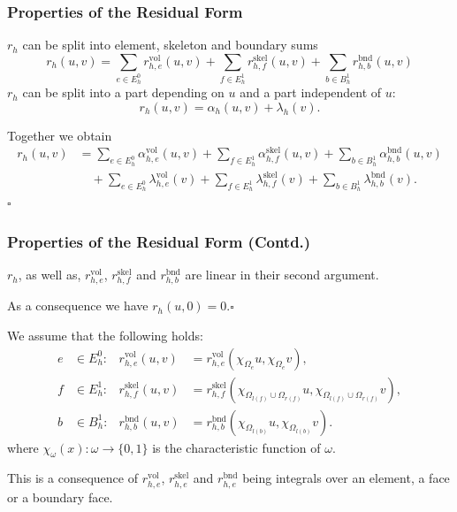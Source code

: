 \begin{frame}
\frametitle<presentation>{Properties of the Residual Form}
\begin{Pro}[Splitting]
$r_h$ can be split into element, skeleton and boundary sums
\begin{equation*}
r_h(u,v) = \sum_{e\in E^0_h} r^\text{vol}_{h,e}(u,v) + \sum_{f\in E^1_h} r^\text{skel}_{h,f}(u,v)
+ \sum_{b\in B^1_h} r^\text{bnd}_{h,b}(u,v)
\end{equation*}
$r_h$ can be split into a part depending
on $u$ and a part independent of $u$:
\begin{equation*}
r_h(u,v) = \alpha_h(u,v) + \lambda_h(v) .
\end{equation*}

Together we obtain
\begin{equation}
\begin{split}
r_h(u,v) &= \sum_{e\in E^0_h} \alpha^\text{vol}_{h,e}(u,v) + \sum_{f\in E^1_h} \alpha^\text{skel}_{h,f}(u,v)
+ \sum_{b\in B^1_h} \alpha^\text{bnd}_{h,b}(u,v)\\
&\quad + \sum_{e\in E^0_h} \lambda^\text{vol}_{h,e}(v) + \sum_{f\in E^1_h} \lambda^\text{skel}_{h,f}(v)
+ \sum_{b\in B^1_h} \lambda^\text{bnd}_{h,b}(v) .
\end{split}
\end{equation}
\hfill$\square$
\end{Pro}
\end{frame}

\begin{frame}
\frametitle<presentation>{Properties of the Residual Form (Contd.)}
\begin{Pro}[Linearity]\label{Ass:Linearity}
$r_h$, as well as, $r^\text{vol}_{h,e}$, $r^\text{skel}_{h,f}$ and
$r^\text{bnd}_{h,b}$ are linear in their second
argument.

As a consequence we have $r_h(u,0)=0$.\hfill$\square$
\end{Pro}
\begin{Pro}[Localization]
We assume that the following holds:
\begin{subequations}
\begin{align*}
e&\in E^0_h : & r^\text{vol}_{h,e}(u,v) &= r^\text{vol}_{h,e}(\chi_{\Omega_e} u,\chi_{\Omega_e} v),\\
f&\in E^1_h : & r^\text{skel}_{h,f}(u,v) &=
r^\text{skel}_{h,f}(\chi_{\Omega_{l(f)}\cup\Omega_{r(f)}}
u,\chi_{\Omega_{l(f)}\cup\Omega_{r(f)}} v),\\ 
b&\in B^1_h : & r^\text{bnd}_{h,b}(u,v) &= r^\text{bnd}_{h,b}(\chi_{\Omega_{l(b)}} u,\chi_{\Omega_{l(b)}} v).
\end{align*}
\end{subequations}
where $\chi_\omega(x) : \omega \to \{0,1\}$ is the characteristic function of $\omega$.

This is a consequence of  $r^\text{vol}_{h,e}$, $r^\text{skel}_{h,e}$
and $r^\text{bnd}_{h,e}$ being integrals over an element, a face or a
boundary face.
\end{Pro}
\end{frame}


